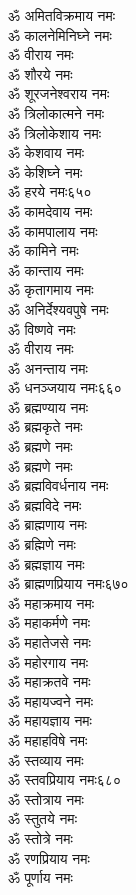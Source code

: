 \begin{center}
\begin{multicols}{2}
\begin{flushleft}
ॐ अमितविक्रमाय नमः\\
ॐ कालनेमिनिघ्ने नमः\\
ॐ वीराय नमः\\
ॐ शौरये नमः\\
ॐ शूरजनेश्वराय नमः\\
ॐ त्रिलोकात्मने नमः\\
ॐ त्रिलोकेशाय नमः\\
ॐ केशवाय नमः\\
ॐ केशिघ्ने नमः\\
ॐ हरये नमः\hfill ६५०\\
ॐ कामदेवाय नमः\\
ॐ कामपालाय नमः\\
ॐ कामिने नमः\\
ॐ कान्ताय नमः\\
ॐ कृतागमाय नमः\\
ॐ अनिर्देश्यवपुषे नमः\\
ॐ विष्णवे नमः\\
ॐ वीराय नमः\\
ॐ अनन्ताय नमः\\
ॐ धनञ्जयाय नमः\hfill ६६०\\
ॐ ब्रह्मण्याय नमः\\
ॐ ब्रह्मकृते नमः\\
ॐ ब्रह्मणे नमः\\
ॐ ब्रह्मणे नमः\\
ॐ ब्रह्मविवर्धनाय नमः\\
ॐ ब्रह्मविदे नमः\\
ॐ ब्राह्मणाय नमः\\
ॐ ब्रह्मिणे नमः\\
ॐ ब्रह्मज्ञाय नमः\\
ॐ ब्राह्मणप्रियाय नमः\hfill ६७०\\
ॐ महाक्रमाय नमः\\
ॐ महाकर्मणे नमः\\
ॐ महातेजसे नमः\\
ॐ महोरगाय नमः\\
ॐ महाक्रतवे नमः\\
ॐ महायज्वने नमः\\
ॐ महायज्ञाय नमः\\
ॐ महाहविषे नमः\\
ॐ स्तव्याय नमः\\
ॐ स्तवप्रियाय नमः\hfill ६८०\\
ॐ स्तोत्राय नमः\\
ॐ स्तुतये नमः\\
ॐ स्तोत्रे नमः\\
ॐ रणप्रियाय नमः\\
ॐ पूर्णाय नमः\\

\end{flushleft}
\end{multicols}
\end{center}
